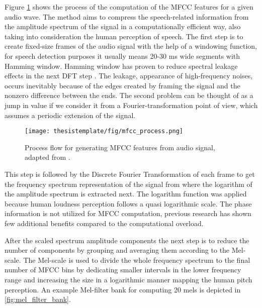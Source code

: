 Figure \ref{fig:mfcc_proc} shows the process of the computation of the MFCC features for a given audio wave. The method aims to compress the speech-related information from the amplitude spectrum of the signal in a computationally efficient way, also taking into consideration the human perception of speech. The first step is to create fixed-size frames of the audio signal with the help of a windowing function, for speech detection purposes it usually means 20-30 ms wide segments with Hamming window. 
Hamming window has proven to reduce spectral leakage effects in the next DFT step \cite{mfcc_logan2000mel}. The leakage, appearance of high-frequency noises, occurs inevitably because of the edges created by framing the signal and the nonzero difference between the ends. The second problem can be thought of as a jump in value if we consider it from a Fourier-transformation point of view, which assumes a periodic extension of the signal.

\begin{figure}[t]
  \begin{center}
    \texttt{[image: thesistemplate/fig/mfcc\_process.png]}
    \caption{Process flow for generating MFCC features from audio signal, adapted from \cite{mfcc_logan2000mel}. }
    \label{fig:mfcc_proc}
  \end{center}
\end{figure}

This step is followed by the Discrete Fourier Transformation of each frame to get the frequency spectrum representation of the signal from where the logarithm of the amplitude spectrum is extracted next. The logarithm function was applied because human loudness perception follows a quasi logarithmic scale. The phase information is not utilized for MFCC computation, previous research has shown few additional benefits compared to the computational overload.

After the scaled spectrum amplitude components the next step is to reduce the number of components by grouping and averaging them according to the Mel-scale. The Mel-scale is used to divide the whole frequency spectrum to the final number of MFCC bins by dedicating smaller intervals in the lower frequency range and increasing the size in a logarithmic manner mapping the human pitch perception. An example Mel-filter bank for computing 20 mels is depicted in \autoref{fig:mel_filter_bank}.

